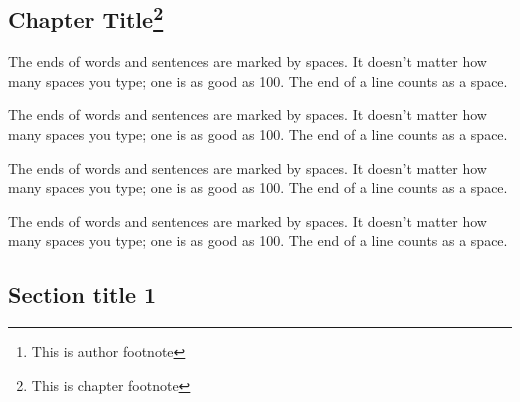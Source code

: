 \cleardoublepage
\begin{frontmatter}
\chapter{Chapter Title\footnote{This is chapter footnote}}%

\begin{aug}
\author[addressrefs={ad1,ad2}]%
  {   \footnote{This is author footnote}}%
\author[addressrefs={ad2}]%
 { }%
\address[id=ad1]%
  {Short Address}%
\address[id=ad2]%
  {Long Address}%
\end{aug}



%
\begin{chapterpoints}%
\item The ends of words and sentences are marked by spaces. It doesn't
  matter how many spaces you type; one is as good as 100.  The end of
  a line counts as a space.

\item The ends of words and sentences are marked by spaces. It doesn't
  matter how many spaces you type; one is as good as 100.  The end of
  a line counts as a space.
\end{chapterpoints}

\begin{dispquote}

  The ends of words and sentences are marked by spaces. It doesn't
  matter how many spaces you type; one is as good as 100.  The end of
  a line counts as a space.

  The ends of words and sentences are marked by spaces. It doesn't
  matter how many spaces you type; one is as good as 100.  The end of
  a line counts as a space.
  

\end{dispquote}

\end{frontmatter}


\section{Section title 1}%
